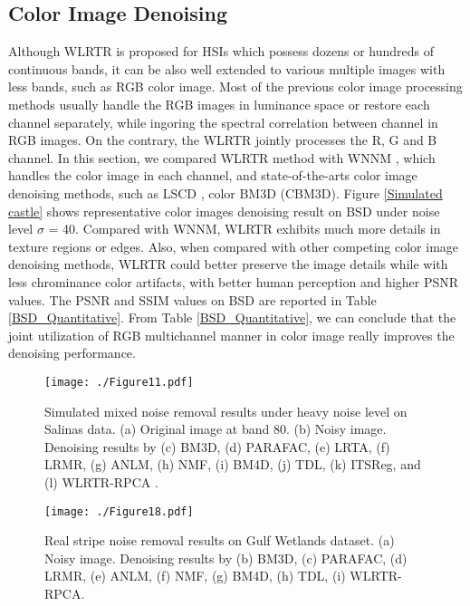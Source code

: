 \documentclass[twocolumn]{svjour3}          %
\begin{document}
  \subsection{Color Image Denoising}
    Although WLRTR is proposed for HSIs which possess dozens or hundreds of continuous bands, it can be also well extended to various multiple images with less bands, such as RGB color image. Most of the previous color image processing methods usually handle the RGB images in luminance space or restore each channel separately, while ingoring the spectral correlation between channel in RGB images. On the contrary, the WLRTR jointly processes the R, G and B channel. In this section, we compared WLRTR method with WNNM \cite{Gu2014Weighted}, which handles the color image in each channel, and state-of-the-arts color image denoising methods, such as LSCD \cite{rizkinia2016local}, color BM3D \cite{dabov2007color} (CBM3D). Figure \ref{Simulated castle} shows representative color images denoising result on BSD under noise level $\sigma$ = 40. Compared with WNNM, WLRTR exhibits much more details in texture regions or edges. Also, when compared with other competing color image denoising methods, WLRTR could better preserve the image details while with less chrominance color artifacts, with better human perception and higher PSNR values. The PSNR and SSIM values on BSD are reported in Table \ref{BSD_Quantitative}. From Table \ref{BSD_Quantitative}, we can conclude that the joint utilization of RGB multichannel manner in color image really improves the denoising performance.

\begin{figure}
\begin{center}
    \texttt{[image: ./Figure11.pdf]}
\end{center}
   \caption{Simulated mixed noise removal results under heavy noise level on Salinas data. (a) Original image at band 80. (b) Noisy image. Denoising results by (c) BM3D, (d) PARAFAC, (e) LRTA, (f) LRMR, (g) ANLM, (h) NMF, (i) BM4D, (j) TDL, (k) ITSReg, and (l) WLRTR-RPCA .}
\label{Simulated Salinas}
\end{figure}

\begin{figure}
\begin{center}
    \texttt{[image: ./Figure18.pdf]}
\end{center}
   \caption{Real stripe noise removal results on Gulf Wetlands dataset. (a) Noisy image. Denoising results by (b) BM3D, (c) PARAFAC, (d) LRMR, (e) ANLM, (f) NMF, (g) BM4D, (h) TDL, (i) WLRTR-RPCA.}
\label{Real Gulf Wetlands}
\end{figure}
\end{document}
